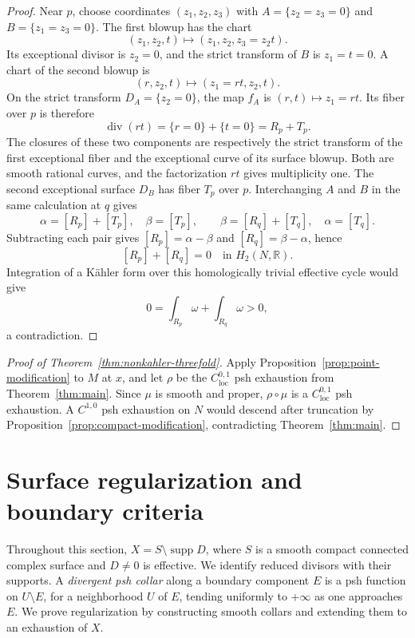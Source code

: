 \documentclass[11pt]{amsart}
\theoremstyle{definition}
\theoremstyle{remark}
\numberwithin{equation}{section}
\newcommand{\R}{\mathbb R}
\newcommand{\supp}{\operatorname{supp}}
\begin{document}
\begin{proof}
Near $p$, choose coordinates $(z_1,z_2,z_3)$ with
$A=\{z_2=z_3=0\}$ and $B=\{z_1=z_3=0\}$.
The first blowup has the chart
\[
 (z_1,z_2,t)\longmapsto(z_1,z_2,z_3=z_2t).
\]
Its exceptional divisor is $z_2=0$, and the strict transform of
$B$ is $z_1=t=0$. A chart of the second blowup is
\[
 (r,z_2,t)\longmapsto(z_1=rt,z_2,t).
\]
On the strict transform $D_A=\{z_2=0\}$, the map $f_A$ is
$(r,t)\mapsto z_1=rt$. Its fiber over $p$ is therefore
\[
 \operatorname{div}(rt)=\{r=0\}+\{t=0\}=R_p+T_p.
\]
The closures of these two components are respectively the strict
transform of the first exceptional fiber and the exceptional curve
of its surface blowup. Both are smooth rational curves, and the
factorization $rt$ gives multiplicity one. The second exceptional
surface $D_B$ has fiber $T_p$ over $p$. Interchanging $A$ and $B$
in the same calculation at $q$ gives
\[
 \alpha=[R_p]+[T_p],\quad\beta=[T_p],\qquad
 \beta=[R_q]+[T_q],\quad\alpha=[T_q].
\]
Subtracting each pair gives
$[R_p]=\alpha-\beta$ and $[R_q]=\beta-\alpha$, hence
\begin{equation}\label{eq:hironaka-zero-cycle}
 [R_p]+[R_q]=0\quad\text{in }H_2(N,\R).
\end{equation}
Integration of a K\"ahler form over this homologically trivial
effective cycle would give
\[
 0=\int_{R_p}\omega+\int_{R_q}\omega>0,
\]
a contradiction.
\end{proof}

\begin{proof}[Proof of Theorem~\ref{thm:nonkahler-threefold}]
Apply Proposition~\ref{prop:point-modification} to $M$ at $x$, and let
$\rho$ be the $C^{0,1}_{\mathrm{loc}}$ psh exhaustion from
Theorem~\ref{thm:main}. Since $\mu$ is smooth and proper,
$\rho\circ\mu$ is a $C^{0,1}_{\mathrm{loc}}$ psh exhaustion.
A $C^{1,0}$ psh exhaustion on
$N$ would descend after truncation by
Proposition~\ref{prop:compact-modification}, contradicting
Theorem~\ref{thm:main}.
\end{proof}

\section{Surface regularization and boundary criteria}\label{sec:surfaces}
Throughout this section, $X=S\setminus\supp D$, where $S$ is a smooth
compact connected complex surface and $D\ne0$ is effective. We identify
reduced divisors with their supports. A \emph{divergent psh collar}
along a boundary component $E$ is a psh function on $U\setminus E$,
for a neighborhood $U$ of $E$, tending uniformly to $+\infty$ as one
approaches $E$. We prove regularization by constructing smooth collars
and extending them to an exhaustion of $X$.
\end{document}
